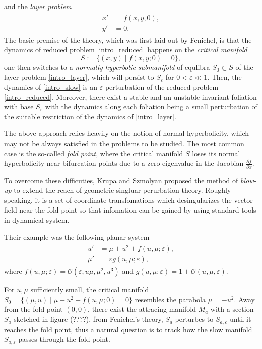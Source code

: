 \documentclass[letterpaper,11pt]{article}
\newcommand{\rmO}{\mathcal{O}}
\newcommand{\eps}{\varepsilon}
\numberwithin{equation}{section}
\theoremstyle{plain}
\begin{document}
and the \textit{layer problem}
\begin{align}\label{intro_layer}
\begin{split}
x' &=  f(x,y,0),\\
y' &=  0. 
\end{split}
\end{align}
The basic premise of the theory, which was first laid out by Fenichel, is that the dynamics of reduced problem \eqref{intro_reduced} happens on the \textit{critical manifold}
\[
S:=  \{ (x,y) \mid f(x,y;0) = 0 \},
\]
one then switches to a \textit{normally hyperbolic submanifold} of equlibra $S_0 \subset S$ of the layer problem \eqref{intro_layer}, which will persist to $S_\eps$ for $0<\eps \ll 1$. Then, the dynamics of \eqref{intro_slow} is an $\eps$-perturbation of the reduced problem \eqref{intro_reduced}. Moreover, there exist a stable and an unstable invariant foliation with base $S_\eps$ with the dynamics along each foliation being a small perturbation of the suitable restriction of the dynamics of \eqref{intro_layer}.

The above approach relies heavily on the notion of normal hyperbolicity, which may not be always satisfied in the problems to be studied. The most common case is the so-called \textit{fold point}, where the critical manifold $S$ loses its normal hyperbolicity near bifurcation points due to a zero eigenvalue in the Jacobian $\frac{\partial f }{\partial x}$.

To overcome these difficuties, Krupa and Szmolyan proposed the method of \textit{blow-up} to extend the reach of geometric singluar perurbation theory. Roughly speaking, it is a set of coordinate transfomations which desingularizes the vector field near the fold point so that infomation can be gained by using standard tools in dynamical system.


Their example was the following planar system 
\begin{align}\label{ori_eqn}
\begin{split}
u' &= \mu+u^2+ f(u,\mu; \eps),\\
\mu' &=  \eps g(u,\mu; \eps),
\end{split}
\end{align}
where $f(u,\mu;\eps) = \rmO(\eps, u\mu,\mu^2,u^3)$ and $g(u,\mu;\eps) = 1+\rmO(u,\mu,\eps)$. 

For $u,\mu$ sufficiently small, the critical manifold $S_0 = \{ (\mu, u) \mid \mu + u^2 +f (u,\mu ;0) = 0\}$ resembles the parabola $\mu = - u^2$. Away from the fold point $(0,0)$, there exist the attracing manifold $M_a$ with a section $S_a$ sketched in figure (????), from Fenichel's theory, $S_a$ perturbes to $S_{a,\eps}$ until it reaches the fold point, thus a natural question is to track how the slow manifold $S_{a,\eps}$ passes through the fold point.
\end{document}
